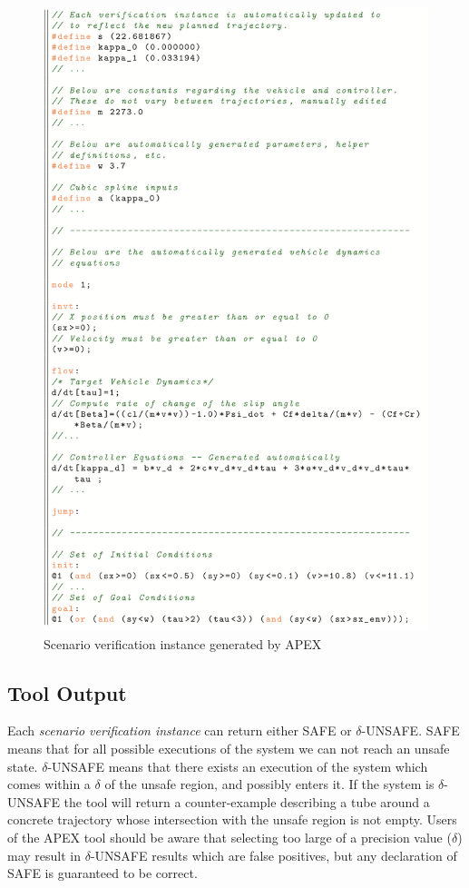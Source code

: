 \begin{figure}[!t]
	\centering
	\includegraphics[width=\columnwidth]{figures/code}
	\caption{Scenario verification instance generated by APEX}
	\label{fig:scenario_ver}
\end{figure}

\subsection{Tool Output}
Each \emph{scenario verification instance} can  return either SAFE or $\delta$-UNSAFE. SAFE means that for all possible executions of the system we can not reach an unsafe state.
$\delta$-UNSAFE means that there exists an execution of the system which comes within a $\delta$ of the unsafe region, and possibly enters it. If the system is $\delta$-UNSAFE the tool will return a counter-example describing a tube around a concrete trajectory whose intersection with the unsafe region is not empty. Users of the APEX tool should be aware that selecting too large of a precision value ($\delta$) may result in $\delta$-UNSAFE results which are false positives, but any declaration of SAFE is guaranteed to be correct. 